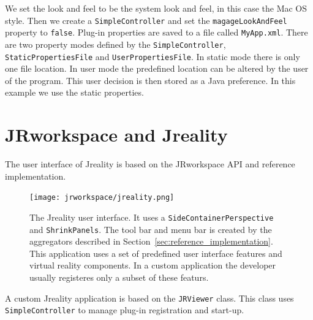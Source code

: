 We set the look and feel to be the system look and feel, in this case the Mac OS style. Then we create a
{\tt SimpleController} and set the {\tt magageLookAndFeel} property to {\tt false}. Plug-in properties are saved
to a file called {\tt MyApp.xml}. There are two property modes defined by the {\tt SimpleController}, {\tt StaticPropertiesFile}
and {\tt UserPropertiesFile}. In static mode there is only one file location. In user mode the predefined location can
be altered by the user of the program. This user decision is then stored as a {\sc Java} preference. In this example 
we use the static properties.

\section{{\sc JRworkspace} and {\sc Jreality}}

The user interface of {\sc Jreality} \cite{JrealityWebsite} is based on the {\sc JRworkspace} API and reference
implementation.

\begin{figure}[H]
\centering
\texttt{[image: jrworkspace/jreality.png]}
\caption[The {\sc Jreality} user interface.]{The {\sc Jreality} user interface. It uses a {\tt SideContainerPerspective} 
and {\tt ShrinkPanels}. The tool bar and 
menu bar is created by the aggregators described in Section~\ref{sec:reference_implementation}. This application
uses a set of predefined user interface features and virtual reality components. In a custom application the developer 
usually registeres only a subset of these featurs.}
\label{fig:tool_bar_aggregator}
\end{figure}

A custom {\sc Jreality} application is based on the {\tt JRViewer} class. This class uses {\tt SimpleController} to manage
plug-in registration and start-up. 


